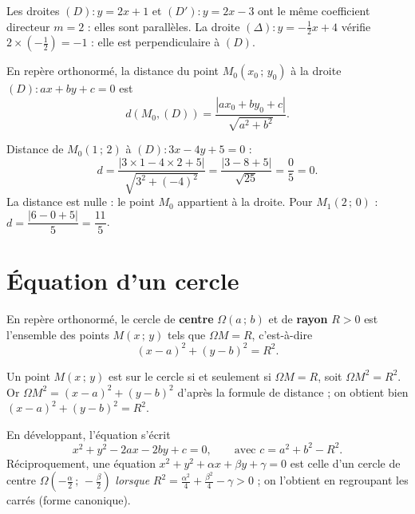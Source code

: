 \begin{exemple}
Les droites $(D):y=2x+1$ et $(D'):y=2x-3$ ont le même coefficient directeur $m=2$ :
elles sont parallèles. La droite $(\Delta):y=-\tfrac{1}{2}x+4$ vérifie
$2\times(-\tfrac{1}{2})=-1$ : elle est perpendiculaire à $(D)$.
\end{exemple}

\begin{propriete}
En repère orthonormé, la distance du point $M_0(x_0\,;\,y_0)$ à la droite
$(D):ax+by+c=0$ est
\[ d(M_0,(D))=\frac{|a x_0+b y_0+c|}{\sqrt{a^2+b^2}}. \]
\end{propriete}

\begin{exemple}
Distance de $M_0(1\,;\,2)$ à $(D):3x-4y+5=0$ :
\[ d=\frac{|3\times 1-4\times 2+5|}{\sqrt{3^2+(-4)^2}}=\frac{|3-8+5|}{\sqrt{25}}
   =\frac{0}{5}=0. \]
La distance est nulle : le point $M_0$ appartient à la droite. Pour
$M_1(2\,;\,0)$ : $d=\dfrac{|6-0+5|}{5}=\dfrac{11}{5}$.
\end{exemple}

\section{Équation d'un cercle}

\begin{theoreme}
En repère orthonormé, le cercle de \textbf{centre} $\Omega(a\,;\,b)$ et de
\textbf{rayon} $R>0$ est l'ensemble des points $M(x\,;\,y)$ tels que $\Omega M=R$,
c'est-à-dire
\[ (x-a)^2+(y-b)^2=R^2. \]
\end{theoreme}

\begin{remarque}[Démonstration]
Un point $M(x\,;\,y)$ est sur le cercle si et seulement si $\Omega M=R$, soit
$\Omega M^2=R^2$. Or $\Omega M^2=(x-a)^2+(y-b)^2$ d'après la formule de distance ;
on obtient bien $(x-a)^2+(y-b)^2=R^2$.
\end{remarque}

\begin{propriete}
En développant, l'équation s'écrit
\[ x^2+y^2-2ax-2by+c=0,\qquad \text{avec } c=a^2+b^2-R^2. \]
Réciproquement, une équation $x^2+y^2+\alpha x+\beta y+\gamma=0$ est celle d'un
cercle de centre $\Omega\!\left(-\tfrac{\alpha}{2}\,;\,-\tfrac{\beta}{2}\right)$
\emph{lorsque} $R^2=\tfrac{\alpha^2}{4}+\tfrac{\beta^2}{4}-\gamma>0$ ; on l'obtient
en regroupant les carrés (forme canonique).
\end{propriete}

